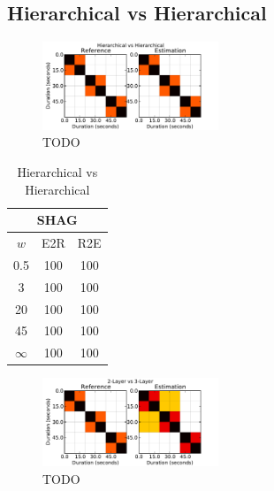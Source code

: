 \documentclass{article}
\begin{document}
\subsection{Hierarchical vs Hierarchical}

\begin{figure}
  \centering
  \includegraphics[width=0.47\textwidth]{plots/hier-hier.pdf}
  \caption{TODO}
  \label{fig:hier-hier}
\end{figure}%

\begin{table}
 \begin{center}
   \begin{tabular}{|c|c|c|}
  \hline
  \multicolumn{3}{|c|}{\textbf{SHAG}} \\
  \hline
  $w$       & E2R    & R2E      \\
  \hline
  0.5       & 100       & 100      \\     
  3         & 100       & 100      \\
  20        & 100     & 100    \\
  45        & 100     & 100    \\
  $\infty$  & 100     & 100    \\
  \hline
 \end{tabular}
\end{center}
  \caption{Hierarchical vs Hierarchical}
  \label{tab:hier-hier}
\end{table}

\begin{figure}
  \centering
  \includegraphics[width=0.47\textwidth]{plots/hier-hiercomp.pdf}
  \caption{TODO}
  \label{fig:hier-hiercomp}
\end{figure}%
\end{document}
